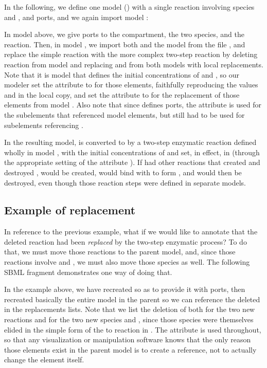In the following, we define one model () with a single
reaction involving species  and , and ports, and we
again import model :


In model  above, we give ports to the compartment, the two
species, and the reaction.  Then, in model , we import
both  and the model  from the file
, and replace the simple reaction with the more
complex two-step reaction by deleting reaction  from model
 and replacing  and  from both models with
local replacements.  Note that it is model  that defines the
initial concentrations of  and , so our modeler set the
attribute  to  for those elements, faithfully
reproducing the values  and  in the local copy, and set
the attribute  to  for the replacement of
those elements from model .  Also note that since
 defines ports, the  attribute is used for the
subelements that referenced  model elements, but
 still had to be used for subelements referencing
.

In the resulting model,  is converted to  by a two-step
enzymatic reaction defined wholly in model , with the
initial concentrations of  and  set, in effect, in
 (through the appropriate setting of the attribute
).  If  had other reactions that created
 and destroyed ,  would be created, would bind with
 to form , and  would then be destroyed, even
though those reaction steps were defined in separate models.


\subsection{Example of replacement}

In reference to the previous example, what if we would like to annotate
that the deleted reaction had been \emph{replaced} by the two-step
enzymatic process?  To do that, we must move those reactions to the
parent model, and, since those reactions involve  and ,
we must also move those species as well.  The following SBML fragment
demonstrates one way of doing that.


In the example above, we have recreated  so as to provide it
with ports, then recreated basically the entire model in the parent
 so we can reference the deleted  in the
replacements lists.  Note that we list the deletion of  both
for the two new reactions and for the two new species  and
, since those species were themselves elided in the simple form
of the  to  reaction in .  The attribute
 is used throughout, so that any visualization or
manipulation software knows that the only reason those elements exist in
the parent model is to create a reference, not to actually change the
element itself.
